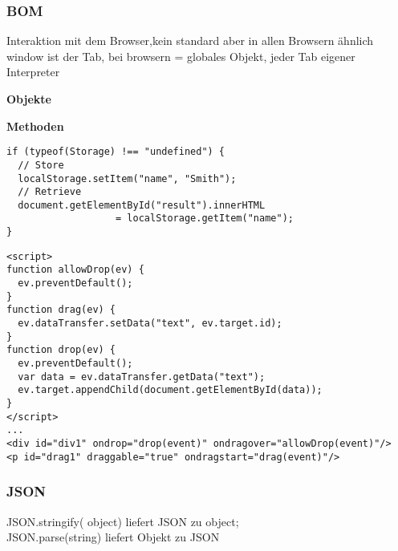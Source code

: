 \newpage
\subsubsection{BOM}
Interaktion mit dem Browser,kein standard aber in allen Browsern ähnlich 
window ist der Tab, bei browsern = globales Objekt, jeder Tab eigener Interpreter

\textbf{Objekte}


\textbf{Methoden}

\begin{verbatim}
if (typeof(Storage) !== "undefined") {
  // Store
  localStorage.setItem("name", "Smith"); 
  // Retrieve
  document.getElementById("result").innerHTML 
                   = localStorage.getItem("name");
} 
\end{verbatim}\newpage
{}
\begin{verbatim}
<script>
function allowDrop(ev) {
  ev.preventDefault();
}
function drag(ev) {
  ev.dataTransfer.setData("text", ev.target.id);
}
function drop(ev) {
  ev.preventDefault();
  var data = ev.dataTransfer.getData("text");
  ev.target.appendChild(document.getElementById(data));
}
</script>
...
<div id="div1" ondrop="drop(event)" ondragover="allowDrop(event)"/>
<p id="drag1" draggable="true" ondragstart="drag(event)"/>
\end{verbatim}

\subsubsection{JSON}
JSON.stringify( object) liefert JSON zu object; \\
JSON.parse(string) liefert Objekt zu JSON

